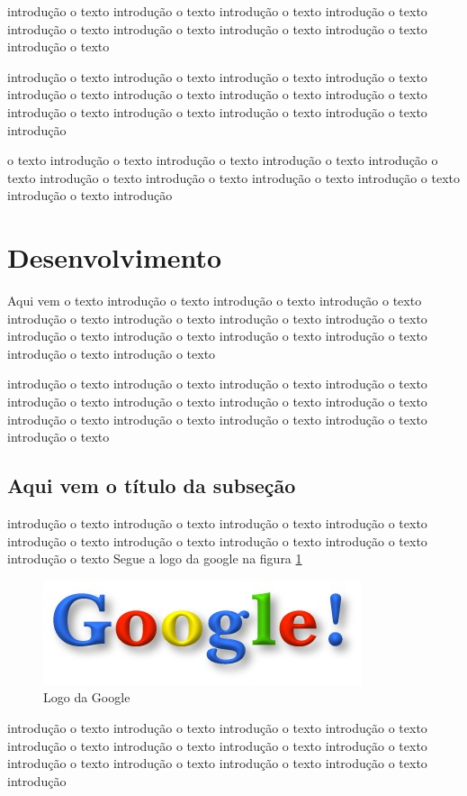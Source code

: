 \documentclass[a4paper, 12pt]{article}
\begin{document}
	 introdução o texto introdução o texto introdução o texto introdução o texto introdução o texto introdução o texto introdução o texto introdução o texto introdução o texto
	 
	  introdução o texto introdução o texto introdução o texto introdução o texto introdução o texto introdução o texto introdução o texto introdução o texto introdução o texto introdução o texto introdução o texto introdução o texto introdução
	  
	   o texto introdução o texto introdução o texto introdução o texto introdução o texto introdução o texto introdução o texto introdução o texto introdução o texto introdução o texto introdução

\section{Desenvolvimento}
	Aqui vem o texto introdução o texto introdução o texto introdução o texto introdução o texto introdução o texto introdução o texto introdução o texto introdução o texto introdução o texto introdução o texto introdução o texto introdução o texto introdução o texto
	
	 introdução o texto introdução o texto introdução o texto introdução o texto introdução o texto introdução o texto introdução o texto introdução o texto introdução o texto introdução o texto introdução o texto introdução o texto introdução o texto 
	 
	 \subsection{Aqui vem o título da subseção}
	 introdução o texto introdução o texto introdução o texto introdução o texto introdução o texto introdução o texto introdução o texto introdução o texto introdução o texto Segue a logo da google na figura \ref{google}

	\begin{figure}[!htb]
	\centering
	\includegraphics[scale=0.3]{img/google.jpg}
	\caption{Logo da Google}
	\label{google}
	\end{figure}

	  introdução o texto introdução o texto introdução o texto introdução o texto introdução o texto introdução o texto introdução o texto introdução o texto introdução o texto introdução o texto introdução o texto introdução o texto introdução
	  
\end{document}
